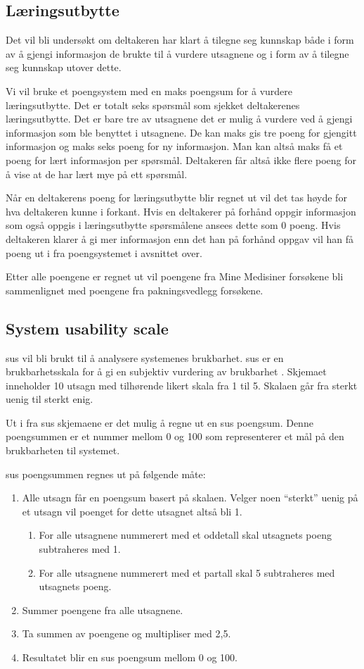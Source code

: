 \subsection{Læringsutbytte}
Det vil bli undersøkt om deltakeren har klart å tilegne seg kunnskap både i form av å gjengi informasjon de brukte til å vurdere utsagnene og i form av å tilegne seg kunnskap utover dette.

Vi vil bruke et poengsystem med en maks poengsum for å vurdere læringsutbytte. Det er totalt seks spørsmål som sjekket deltakerenes læringsutbytte. Det er bare tre av utsagnene det er mulig å vurdere ved å gjengi informasjon som ble benyttet i utsagnene. De kan maks gis tre poeng for gjengitt informasjon og maks seks poeng for ny informasjon. Man kan altså maks få et poeng for lært informasjon per spørsmål. Deltakeren får altså ikke flere poeng for å vise at de har lært mye på ett spørsmål.

Når en deltakerens poeng for læringsutbytte blir regnet ut vil det tas høyde for hva deltakeren kunne i forkant. Hvis en deltakerer på forhånd oppgir informasjon som også oppgis i læringsutbytte spørsmålene ansees dette som 0 poeng. Hvis deltakeren klarer å gi mer informasjon enn det han på forhånd oppgav vil han få poeng ut i fra poengsystemet i avsnittet over.

Etter alle poengene er regnet ut vil poengene fra Mine Medisiner forsøkene bli sammenlignet med poengene fra pakningsvedlegg forsøkene.

\subsection{System usability scale} \label{subsec:SUS}
\acrfull{sus} vil bli brukt til å analysere systemenes brukbarhet. \acrshort{sus} er en brukbarhetsskala for å gi en subjektiv vurdering av brukbarhet \citep{sus}. Skjemaet inneholder 10 utsagn med tilhørende likert skala fra 1 til 5. Skalaen går fra sterkt uenig til sterkt enig.

Ut i fra \acrshort{sus} skjemaene er det mulig å regne ut en \acrshort{sus} poengsum. Denne poengsummen er et nummer mellom 0 og 100 som representerer et mål på den brukbarheten til systemet.

\acrshort{sus} poengsummen regnes ut på følgende måte:
\begin{enumerate}
\item Alle utsagn får en poengsum basert på skalaen. Velger noen ``sterkt'' uenig på et utsagn vil poenget for dette utsagnet altså bli 1.
\begin{enumerate}
\item For alle utsagnene nummerert med et oddetall skal utsagnets poeng subtraheres med 1.
\item For alle utsagnene nummerert med et partall skal 5 subtraheres med utsagnets poeng.
\end{enumerate}
\item Summer poengene fra alle utsagnene.
\item Ta summen av poengene og multipliser med 2,5. 
\item Resultatet blir en \acrshort{sus} poengsum mellom 0 og 100.
\end{enumerate}

